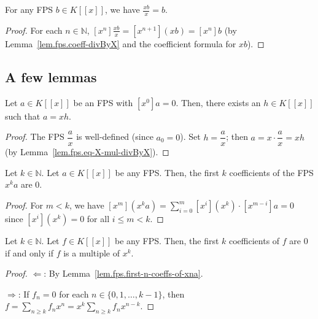 \begin{lemma}
\label{lem.fps.divByX-X-mul}
\leanhelper
\leanok
For any FPS $b\in K[[x]]$, we have $\frac{xb}{x}=b$.
\end{lemma}

\begin{proof}
\leanok
For each $n\in\mathbb{N}$, $[x^n]\frac{xb}{x}=[x^{n+1}](xb)=[x^n]b$
(by Lemma~\ref{lem.fps.coeff-divByX} and the coefficient formula for $xb$).
\end{proof}

\subsection{A few lemmas}

\begin{lemma}
\label{lem.fps.g=xh}
\leantarget
\leanok
Let $a\in K[[x]]$ be an FPS
with $\left[x^{0}\right]a=0$. Then, there exists an $h\in K[[x]]$ such that $a=xh$.
\end{lemma}

\begin{proof}
\leanok
The FPS $\dfrac{a}{x}$ is well-defined (since $a_0 = 0$).
Set $h = \dfrac{a}{x}$; then $a = x \cdot \dfrac{a}{x} = xh$
(by Lemma~\ref{lem.fps.eq-X-mul-divByX}).
\end{proof}

\begin{lemma}
\label{lem.fps.first-n-coeffs-of-xna}
\leantarget
\leanok
Let $k\in\mathbb{N}$. Let $a\in K[[x]]$ be any FPS. Then, the first $k$ coefficients of
the FPS $x^{k}a$ are $0$.
\end{lemma}

\begin{proof}
\leanok
For $m<k$, we have
$[x^m](x^k a) = \sum_{i=0}^{m} [x^i](x^k)\cdot [x^{m-i}]a = 0$
since $[x^i](x^k) = 0$ for all $i\leq m < k$.
\end{proof}

\begin{lemma}
\label{lem.fps.muls-of-xn}
\leantarget
\leanok
Let $k\in\mathbb{N}$. Let $f\in K[[x]]$ be any FPS. Then, the first $k$ coefficients of
$f$ are $0$ if and only if $f$ is a multiple of $x^{k}$.
\end{lemma}

\begin{proof}
\leanok
$\Longleftarrow$: By Lemma~\ref{lem.fps.first-n-coeffs-of-xna}.

$\Longrightarrow$: If $f_n = 0$ for each $n \in \{0, 1, \ldots, k-1\}$, then
$f = \sum_{n \geq k} f_n x^n = x^k \sum_{n \geq k} f_n x^{n-k}$.
\end{proof}

